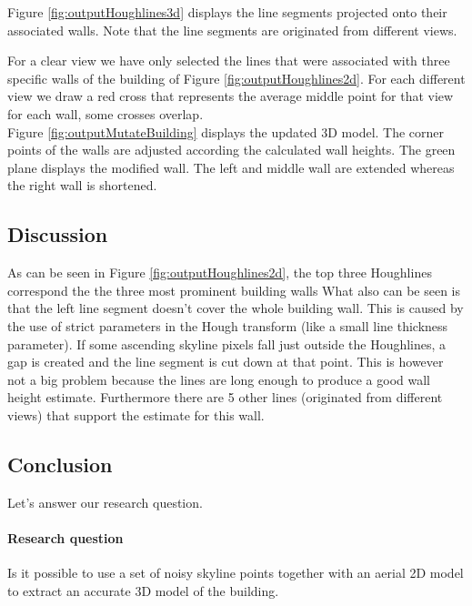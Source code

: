 Figure \ref{fig:outputHoughlines3d} 
 displays the line segments projected onto their associated walls.
Note that the line segments are originated from different views. 
 
For a clear view we have only selected the lines that were associated with three
specific walls of the building of Figure \ref{fig:outputHoughlines2d}.  
For each different view we draw a red cross that represents the average middle
point for that view for each wall, some crosses overlap.\\

Figure \ref{fig:outputMutateBuilding} 
displays the updated 3D model. The
corner points of the walls are adjusted according the calculated wall heights.
The green plane displays the modified wall. The left and middle wall are extended
whereas the right wall is shortened.\\


\subsection{Discussion}
As can be seen in Figure \ref{fig:outputHoughlines2d}, 
the top three Houghlines correspond the the three most prominent building walls
What also can be seen is that the left line segment doesn't cover the whole
building wall. This is caused by the use of strict parameters in the Hough transform
(like a small line thickness parameter).  If some ascending skyline pixels fall just outside
the Houghlines, a gap is created and the line segment is cut down at that point.
This is however not a big problem because the lines are long enough to produce a
good wall height estimate. Furthermore there are 5 other lines
(originated from different views) that support the estimate for this wall.\\



\subsection{Conclusion}
Let's answer our research question.
\paragraph{Research question}
Is it possible to use a set of noisy skyline points together with an aerial 2D model to 
extract an accurate 3D model of the building.\\

